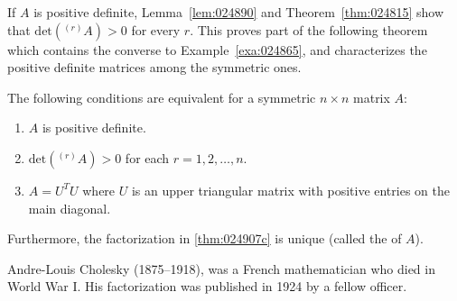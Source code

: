\documentclass{ximera}
\begin{document}
If $A$ is positive definite, Lemma~\ref{lem:024890} and Theorem~\ref{thm:024815} show that $\mbox{det}(^{(r)}A) > 0$ for every $r$. This proves part of the following theorem which contains the converse to Example~\ref{exa:024865}, and characterizes the positive definite matrices among the symmetric ones.


\begin{theorem}\label{thm:024907}
The following conditions are equivalent for a symmetric $n \times n$ matrix $A$:

\begin{enumerate}
\item\label{thm:024907a} $A$ is positive definite.

\item\label{thm:024907b} $\mbox{det}(^{(r)}A) > 0$ for each $r = 1, 2, \dots, n$.

\item\label{thm:024907c} $A = U^{T}U$ where $U$ is an upper triangular matrix with positive entries on the main diagonal.
\end{enumerate}

Furthermore, the factorization in \ref{thm:024907c} is unique (called the  of $A$).
\end{theorem}

\begin{remark}
    Andre-Louis
 Cholesky (1875--1918), was a French mathematician who died in World War
I. His factorization was published in 1924 by a fellow officer.
\end{remark}
\end{document}
